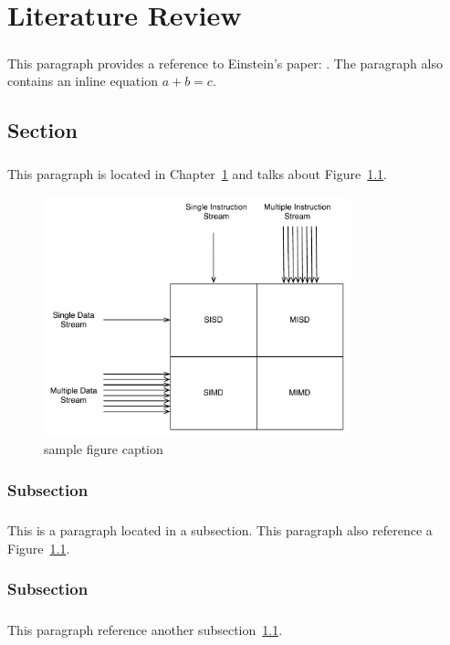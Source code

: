 \chapter{Literature Review}
\label{chap:chapter1}

\paragraph{}This paragraph provides a reference to Einstein's paper: \cite{Einstein}. The paragraph also contains an inline equation $a+b=c$.

\section{Section}
\label{sec:section1}

\paragraph{}This paragraph is located in Chapter~\ref{chap:chapter1} and talks about Figure~\ref{fig:sampleFigureLabel}.

\begin{figure}[h]
\centering
\includegraphics[width=3.5in]{./Figures/sampleFigureFlynn.pdf}
\caption{sample figure caption}
\label{fig:sampleFigureLabel}
\end{figure}

\subsection{Subsection} 
\label{ssec:subsection1}


\paragraph{}This is a paragraph located in a subsection.  This paragraph also reference a  Figure~\ref{fig:sampleFigureLabel}.


\subsection{Subsection}
\label{ssec:subsection2}

\paragraph{}This paragraph reference another subsection~\ref{sec:section1}.